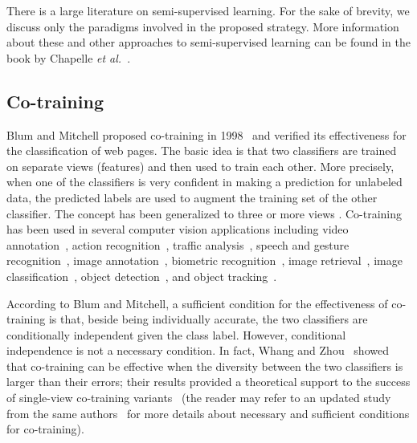 \documentclass[journal,11pt]{IEEEtran}
\newcommand{\coso}{strategy}
\begin{document}
There is a large literature on semi-supervised learning. For the sake
of brevity, we discuss only the paradigms involved in the proposed
\coso.  More information about these and other approaches to
semi-supervised learning can be found in the book by Chapelle \emph{et
  al.}~\cite{chapelle2006semi}.
	
\subsection{Co-training}
Blum and Mitchell proposed co-training in
1998~\cite{blum1998combining} and verified its effectiveness for the
classification of web pages.  The basic idea is that two classifiers
are trained on separate views (features) and then used to train each
other.  More precisely, when one of the classifiers is very confident
in making a prediction for unlabeled data, the predicted labels are
used to augment the training set of the other classifier.  
The concept has been generalized to three \cite{zhou2005tritraining} or more views \cite{li2007improve,zhou2011semi}. 
Co-training has been used in several computer vision applications including video
annotation~\cite{wang2006enhanced}, action
recognition~\cite{gupta2008watch}, traffic
analysis~\cite{levin2003unsupervised}, speech and gesture
recognition~\cite{christoudias2006coadaptation}, image
annotation~\cite{feng2003bootstrapping}, biometric
recognition~\cite{bhatt2011cotraining}, image
retrieval~\cite{tong2001support}, image
classification~\cite{guillaumin2010multimodal}, 
object detection~\cite{levin2003unsupervised,javed2005online}, and object tracking~\cite{tang2007co}. 

According to Blum and Mitchell, a sufficient condition for the
effectiveness of co-training is that, beside being individually
accurate, the two classifiers are conditionally independent given the
class label.  However, conditional independence is not a necessary
condition.  In fact, Whang and Zhou~\cite{wang2007analyzing} showed
that co-training can be effective when the diversity between the two
classifiers is larger than their errors; their results provided a
theoretical support to the success of single-view co-training
variants~\cite{goldman2000enhancing,chen2011automatic,wang2013co} (the reader
may refer to an updated study from the same authors~\cite{wang2010new}
for more details about necessary and sufficient conditions for
co-training).
\end{document}
